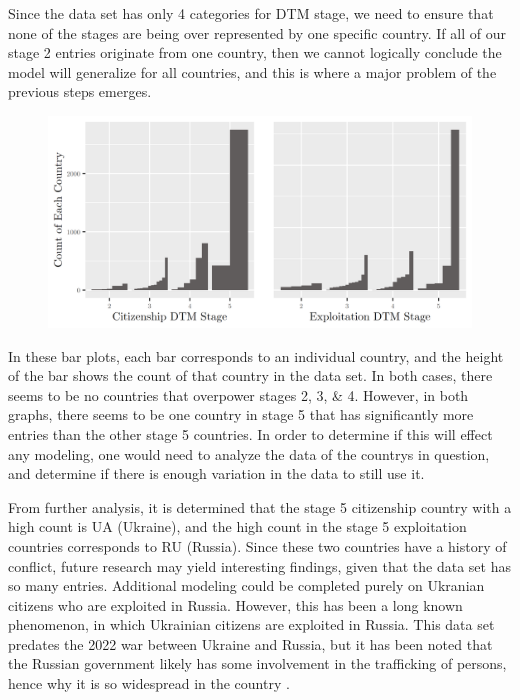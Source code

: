 \documentclass{article} %
\begin{document}
Since the data set has only 4 categories for DTM stage, we need to ensure that none of the stages are being over represented by one specific country. If all of our stage 2 entries originate from one country, then we cannot logically conclude the model will generalize for all countries, and this is where a major problem of the previous steps emerges.

\FloatBarrier
\begin{figure}[H]
	\includegraphics[width = \textwidth]{CountryCountBarplot}
\end{figure}
\FloatBarrier

In these bar plots, each bar corresponds to an individual country, and the height of the bar shows the count of that country in the data set. In both cases, there seems to be no countries that overpower stages 2, 3, \& 4. However, in both graphs, there seems to be one country in stage 5 that has significantly more entries than the other stage 5 countries. In order to determine if this will effect any modeling, one would need to analyze the data of the countrys in question, and determine if there is enough variation in the data to still use it. 

From further analysis, it is determined that the stage 5 citizenship country with a high count is UA (Ukraine), and the high count in the stage 5 exploitation countries corresponds to RU (Russia). Since these two countries have a history of conflict, future research may yield interesting findings, given that the data set has so many entries. Additional modeling could be completed purely on Ukranian citizens who are exploited in Russia. However, this has been a long known phenomenon, in which Ukrainian citizens are exploited in Russia. This data set predates the 2022 war between Ukraine and Russia, but it has been noted that the Russian government likely has some involvement in the trafficking of persons, hence why it is so widespread in the country \parencite{RussiaTrafficking}.
\end{document}

